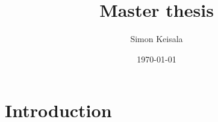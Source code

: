 \documentclass{article}
\title{Master thesis}
\author{Simon Keisala}
\date{\today}
\begin{document}


\section{Introduction}
\end{document}
